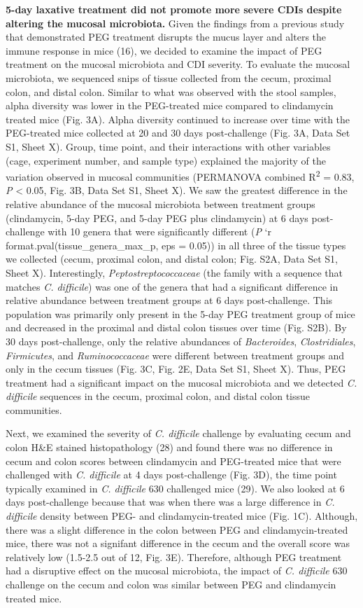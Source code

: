 \documentclass[
  11pt,
]{article}
\begin{document}
\textbf{5-day laxative treatment did not promote more severe CDIs
despite altering the mucosal microbiota.} Given the findings from a
previous study that demonstrated PEG treatment disrupts the mucus layer
and alters the immune response in mice (16), we decided to examine the
impact of PEG treatment on the mucosal microbiota and CDI severity. To
evaluate the mucosal microbiota, we sequenced snips of tissue collected
from the cecum, proximal colon, and distal colon. Similar to what was
observed with the stool samples, alpha diversity was lower in the
PEG-treated mice compared to clindamycin treated mice (Fig. 3A). Alpha
diversity continued to increase over time with the PEG-treated mice
collected at 20 and 30 days post-challenge (Fig. 3A, Data Set S1, Sheet
X). Group, time point, and their interactions with other variables
(cage, experiment number, and sample type) explained the majority of the
variation observed in mucosal communities (PERMANOVA combined
R\textsuperscript{2} = 0.83, \emph{P} \textless{} 0.05, Fig. 3B, Data
Set S1, Sheet X). We saw the greatest difference in the relative
abundance of the mucosal microbiota between treatment groups
(clindamycin, 5-day PEG, and 5-day PEG plus clindamycin) at 6 days
post-challenge with 10 genera that were significantly different
(\emph{P} `r format.pval(tissue\_genera\_max\_p, eps = 0.05)) in all
three of the tissue types we collected (cecum, proximal colon, and
distal colon; Fig. S2A, Data Set S1, Sheet X). Interestingly,
\emph{Peptostreptococcaceae} (the family with a sequence that matches
\emph{C. difficile}) was one of the genera that had a significant
difference in relative abundance between treatment groups at 6 days
post-challenge. This population was primarily only present in the 5-day
PEG treatment group of mice and decreased in the proximal and distal
colon tissues over time (Fig. S2B). By 30 days post-challenge, only the
relative abundances of \emph{Bacteroides}, \emph{Clostridiales},
\emph{Firmicutes}, and \emph{Ruminococcaceae} were different between
treatment groups and only in the cecum tissues (Fig. 3C, Fig. 2E, Data
Set S1, Sheet X). Thus, PEG treatment had a significant impact on the
mucosal microbiota and we detected \emph{C. difficile} sequences in the
cecum, proximal colon, and distal colon tissue communities.

Next, we examined the severity of \emph{C. difficile} challenge by
evaluating cecum and colon H\&E stained histopathology (28) and found
there was no difference in cecum and colon scores between clindamycin
and PEG-treated mice that were challenged with \emph{C. difficile} at 4
days post-challenge (Fig. 3D), the time point typically examined in
\emph{C. difficile} 630 challenged mice (29). We also looked at 6 days
post-challenge because that was when there was a large difference in
\emph{C. difficile} density between PEG- and clindamycin-treated mice
(Fig. 1C). Although, there was a slight difference in the colon between
PEG and clindamycin-treated mice, there was not a signifant difference
in the cecum and the overall score was relatively low (1.5-2.5 out of
12, Fig. 3E). Therefore, although PEG treatment had a disruptive effect
on the mucosal microbiota, the impact of \emph{C. difficile} 630
challenge on the cecum and colon was similar between PEG and clindamycin
treated mice.
\end{document}
